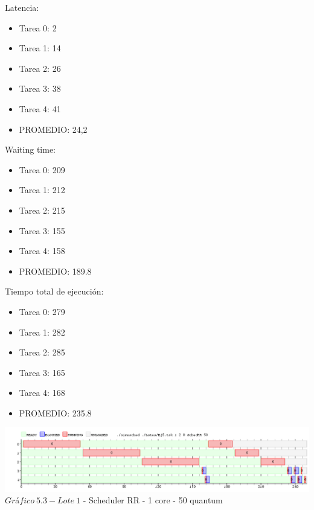 \indent Latencia:\
\begin{itemize}
 \item Tarea 0: 2
 \item Tarea 1: 14
 \item Tarea 2: 26
 \item Tarea 3: 38
 \item Tarea 4: 41
 \item PROMEDIO: 24,2
\end{itemize}
\indent Waiting time:\
\begin{itemize}
 \item Tarea 0: 209
 \item Tarea 1: 212
 \item Tarea 2: 215
 \item Tarea 3: 155
 \item Tarea 4: 158
 \item PROMEDIO: 189.8
\end{itemize}
\indent Tiempo total de ejecuci\'{o}n:\
\begin{itemize}
 \item Tarea 0: 279
 \item Tarea 1: 282
 \item Tarea 2: 285
 \item Tarea 3: 165
 \item Tarea 4: 168
 \item PROMEDIO: 235.8
\end{itemize}

\begin{center}
  	\includegraphics[width=450pt]{ej5quantum50.png}
	  {$Gr$\'a$fico \ 5.3 - Lote \ 1$ - Scheduler RR - 1 core - 50 quantum}	
\end{center}

